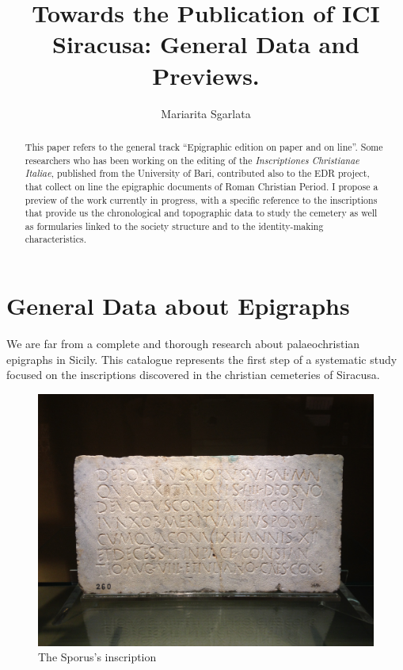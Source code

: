 \documentclass[amsthm,ebook]{saparticle}
\title{Towards the Publication of ICI Siracusa: General Data and Previews.}
\author[unica]{Mariarita Sgarlata\corref{first}}
\begin{document}
\maketitle
\begin{abstract}
This paper refers to the general track ``Epigraphic edition on paper and on line''. Some researchers who has been working on the editing of the \emph{Inscriptiones Christianae Italiae}, published from the University of Bari, contributed also to the EDR project, that collect on line the epigraphic documents of Roman Christian Period. I propose a preview of the work currently in progress, with a specific reference to the inscriptions that provide us the chronological and topographic data to study the cemetery as well as formularies linked to the society structure and to the identity-making characteristics.
\end{abstract}

\section{General Data about Epigraphs}


\noindent We are far from a complete and thorough research about palaeochristian epigraphs in Sicily. This catalogue represents the first step of a systematic study focused on the inscriptions discovered in the christian cemeteries of Siracusa.

\begin{figure}[hbp]
\centering
 \includegraphics[width=\columnwidth]{Sporus.JPG}
\caption{The Sporus’s inscription}
\label{fig:2}
\end{figure}
\end{document}
